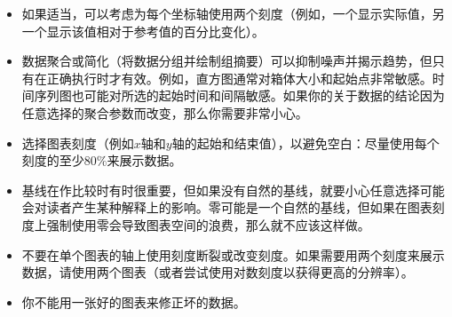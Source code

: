 \begin{itemize}
\item 如果适当，可以考虑为每个坐标轴使用两个刻度（例如，一个显示实际值，另一个显示该值相对于参考值的百分比变化）。
\item 数据聚合或简化（将数据分组并绘制组摘要）可以抑制噪声并揭示趋势，但只有在正确执行时才有效。例如，直方图通常对箱体大小和起始点非常敏感。时间序列图也可能对所选的起始时间和间隔敏感。如果你的关于数据的结论因为任意选择的聚合参数而改变，那么你需要非常小心。
\item 选择图表刻度（例如$x$轴和$y$轴的起始和结束值），以避免空白：尽量使用每个刻度的至少$80 \%$来展示数据。
\item 基线在作比较时有时很重要，但如果没有自然的基线，就要小心任意选择可能会对读者产生某种解释上的影响。零可能是一个自然的基线，但如果在图表刻度上强制使用零会导致图表空间的浪费，那么就不应该这样做。
\item 不要在单个图表的轴上使用刻度断裂或改变刻度。如果需要用两个刻度来展示数据，请使用两个图表（或者尝试使用对数刻度以获得更高的分辨率）。
\item 你不能用一张好的图表来修正坏的数据。
\end{itemize}

